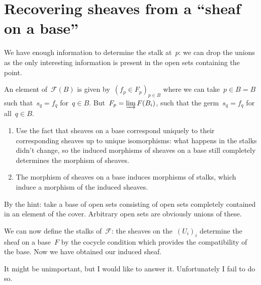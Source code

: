 \section{Recovering sheaves from a ``sheaf on a base''}

\begin{exercise}
  We have enough information to determine the stalk at~$p$: we can drop the unions as the only interesting information is present in the open sets containing the point.
\end{exercise}

\begin{exercise}
  \label{exercise:37b}
  An element of~$\mathcal{F}(B)$ is given by~$(f_p\in F_p)_{p\in B}$ where we can take~$p\in B=B$ such that~$s_q=f_q$ for~$q\in B$. But~$F_p=\varinjlim F(B_i)$, such that the germ~$s_q=f_q$ for all~$q\in B$.
\end{exercise}

\begin{exercise}
  \begin{enumerate}
    \item Use the fact that sheaves on a base correspond uniquely to their corresponding sheaves up to unique isomorphisms: what happens in the stalks didn't change, so the induced morphisms of sheaves on a base still completely determines the morphism of sheaves.

    \item The morphism of sheaves on a base induces morphisms of stalks, which induce a morphism of the induced sheaves.
  \end{enumerate}
\end{exercise}

\begin{exercise}
  By the hint: take a base of open sets consisting of open sets completely contained in an element of the cover. Arbitrary open sets are obviously unions of these.

  We can now define the stalks of~$\mathcal{F}$: the sheaves on the~$(U_i)_i$ determine the sheaf on a base~$F$ by the cocycle condition which provides the compatibility of the base. Now we have obtained our induced sheaf.
\end{exercise}

\begin{exercise}
  \label{exercise:37e}
  It might be unimportant, but I would like to answer it. Unfortunately I fail to do so.
\end{exercise}

